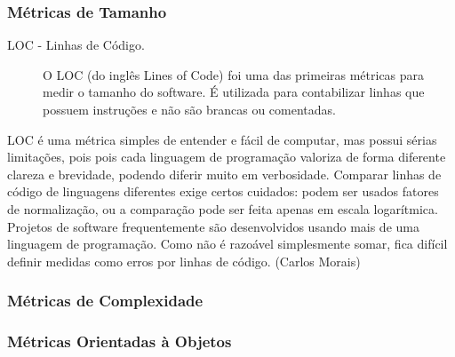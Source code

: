 \subsubsection{Métricas de Tamanho}
\label{metrica tamanho} 
	
	\begin{description}
	\item[LOC - Linhas de Código.] O LOC (do inglês Lines of Code) foi uma das primeiras métricas para medir o tamanho do software. É utilizada para contabilizar linhas que possuem instruções e não são brancas ou comentadas. 
	\end{description}

LOC é uma métrica simples de entender e fácil de computar, mas possui sérias limitações, pois pois cada linguagem de programação valoriza
de forma diferente clareza e brevidade, podendo diferir muito em verbosidade. Comparar linhas de
código de linguagens diferentes exige certos cuidados: podem ser usados fatores de normalização, ou
a comparação pode ser feita apenas em escala logarítmica. Projetos de software frequentemente são
desenvolvidos usando mais de uma linguagem de programação. Como não é razoável simplesmente
somar, fica difícil definir medidas como erros por linhas de código. (Carlos Morais)



\subsubsection {Métricas de Complexidade}
\label {metrica complexidade}


\subsubsection{Métricas Orientadas à Objetos}
\label{metrica objetos}






